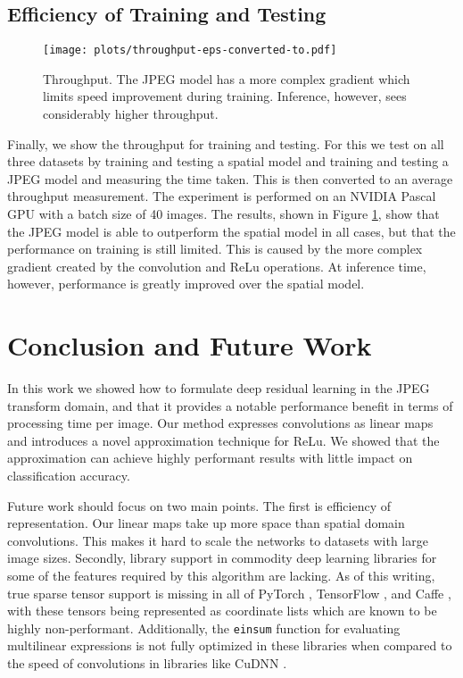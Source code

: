 \documentclass[10pt,twocolumn,letterpaper]{article}
\begin{document}
\subsection{Efficiency of Training and Testing}\label{sec:expeff}\begin{figure}[b]
    \texttt{[image: plots/throughput-eps-converted-to.pdf]}
    \caption{Throughput. The JPEG model has a more complex gradient which limits speed improvement during training. Inference, however,  sees considerably higher throughput.}
    \label{fig:tp}
\end{figure}Finally, we show the throughput for training and testing. For this we test on all three datasets by training and testing a spatial model and training and testing a JPEG model and measuring the time taken. This is then converted to an average throughput measurement. The experiment is performed on an NVIDIA Pascal GPU with a batch size of 40 images. The results, shown in Figure \ref{fig:tp}, show that the JPEG model is able to outperform the spatial model in all cases, but that the performance on training is still limited. This is caused by the more complex gradient created by the convolution and ReLu operations. At inference time, however, performance is greatly improved over the spatial model.
\section{Conclusion and Future Work}

In this work we showed how to formulate deep residual learning in the JPEG transform domain, and that it provides a notable performance benefit in terms of processing time per image. Our method expresses convolutions as linear maps \cite{smith1994fast} and introduces a novel approximation technique for ReLu. We showed that the approximation can achieve highly performant results with little impact on classification accuracy.

Future work should focus on two main points. The first is efficiency of representation. Our linear maps take up more space than spatial domain convolutions. This makes it hard to scale the networks to datasets with large image sizes. Secondly, library support in commodity deep learning libraries for some of the features required by this algorithm are lacking. As of this writing, true sparse tensor support is missing in all of PyTorch \cite{paszke2017automatic}, TensorFlow \cite{tensorflow2015-whitepaper}, and Caffe \cite{jia2014caffe}, with these tensors being represented as coordinate lists which are known to be highly non-performant. Additionally, the \texttt{einsum} function for evaluating multilinear expressions is not fully optimized in these libraries when compared to the speed of convolutions in libraries like CuDNN \cite{chetlur2014cudnn}.\newpage{\small
    \printbibliography
}
\cleardoublepage


\end{document}
